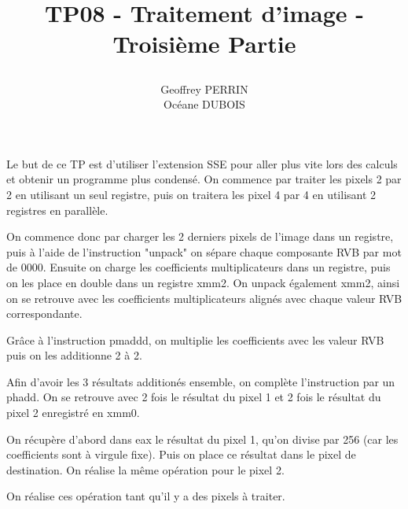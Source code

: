 \documentclass[11pt]{report}
\title{\textbf{TP08 - Traitement d'image - Troisième Partie }
\author{Geoffrey PERRIN \\ Océane DUBOIS\\}
\date{}}
\begin{document}
\maketitle

\newpage

Le but de ce TP est d'utiliser l'extension SSE pour aller plus vite lors des calculs et obtenir un programme plus condensé. 
On commence par traiter les pixels 2 par 2 en utilisant un seul registre, puis on traitera les pixel 4 par 4 en utilisant 2 registres en parallèle.

On commence donc par charger les 2 derniers pixels de l'image dans un registre, puis à l'aide de l'instruction "unpack" on sépare chaque composante RVB par mot de 0000. Ensuite on charge les coefficients multiplicateurs dans un registre, puis on les place en double dans un registre xmm2.
On unpack également xmm2, ainsi on se retrouve avec les coefficients multiplicateurs alignés avec chaque valeur RVB correspondante.  

Grâce à l'instruction pmaddd, on multiplie les coefficients avec les valeur RVB puis on les additionne 2 à 2.

Afin d'avoir les 3 résultats additionés ensemble, on complète l'instruction par un phadd. On se retrouve avec 2 fois le résultat du pixel 1 et 2 fois le résultat du pixel 2 enregistré en xmm0. 

On récupère d'abord dans eax le résultat du pixel 1, qu'on divise par 256 (car les coefficients sont à virgule fixe). Puis on place ce résultat dans le pixel de destination.
On réalise la même opération pour le pixel 2. 

On réalise ces opération tant qu'il y a des pixels à traiter. 
\end{document}

